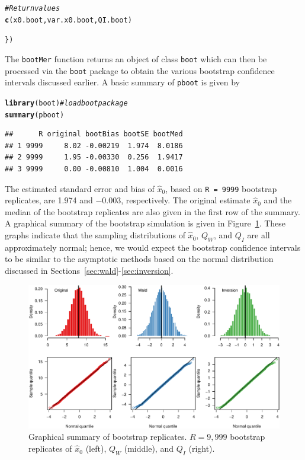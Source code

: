 \documentclass{article}\usepackage[]{graphicx}\usepackage[]{color}
\makeatletter
\newcommand{\hlcom}[1]{\textcolor[rgb]{0.678,0.584,0.686}{\textit{#1}}}%
\newcommand{\hlstd}[1]{\textcolor[rgb]{0.345,0.345,0.345}{#1}}%
\newcommand{\hlkwd}[1]{\textcolor[rgb]{0.737,0.353,0.396}{\textbf{#1}}}%
\newenvironment{kframe}{%
 \def\at@end@of@kframe{}%
 \ifinner\ifhmode%
  \def\at@end@of@kframe{\end{minipage}}%
  \begin{minipage}{\columnwidth}%
 \fi\fi%
 \def\FrameCommand##1{\hskip\@totalleftmargin \hskip-\fboxsep
 \colorbox{shadecolor}{##1}\hskip-\fboxsep
     \hskip-\linewidth \hskip-\@totalleftmargin \hskip\columnwidth}%
 \MakeFramed {\advance\hsize-\width
   \@totalleftmargin\z@ \linewidth\hsize
   \@setminipage}}%
 {\par\unskip\endMakeFramed%
 \at@end@of@kframe}
\newenvironment{knitrout}{}{} %
\makeatother
\begin{document}
\begin{knitrout}
\begin{kframe}
\begin{alltt}
  \hlcom{# Return values}
  \hlkwd{c}\hlstd{(x0.boot, var.x0.boot, QI.boot)}

\hlstd{\})}
\end{alltt}
\end{kframe}
\end{knitrout}
The \texttt{bootMer} function returns an object of class \texttt{boot} which can then be processed via the \texttt{boot} package to obtain the various bootstrap confidence intervals discussed earlier.  A basic summary of \texttt{pboot} is given by
\begin{knitrout}
\color{fgcolor}\begin{kframe}
\begin{alltt}
\hlkwd{library}\hlstd{(boot)}  \hlcom{# load boot package}
\hlkwd{summary}\hlstd{(pboot)}
\end{alltt}
\begin{verbatim}
##      R original bootBias bootSE bootMed
## 1 9999     8.02 -0.00219  1.974  8.0186
## 2 9999     1.95 -0.00330  0.256  1.9417
## 3 9999     0.00 -0.00810  1.004  0.0016
\end{verbatim}
\end{kframe}
\end{knitrout}
The estimated standard error and bias of $\widehat{x}_0$, based on \texttt{R = 9999} bootstrap replicates, are 1.974 and \ensuremath{-0.003}, respectively.  The original estimate $\widehat{x}_0$ and the median of the bootstrap replicates are also given in the first row of the summary.  A graphical summary of the bootstrap simulation is given in Figure~\ref{fig:boot-plots}.  These graphs indicate that the sampling distributions of $\widehat{x}_0$, $Q_W$, and $Q_I$ are all approximately normal; hence, we would expect the bootstrap confidence intervals to be similar to the asymptotic methods based on the normal distribution discussed in Sections~\ref{sec:wald}-\ref{sec:inversion}.
\begin{knitrout}
\color{fgcolor}\begin{figure}[!htb]
\includegraphics[width=\linewidth]{figure/boot-plots-1} \caption[Graphical summary of bootstrap replicates]{Graphical summary of bootstrap replicates. $R = 9,999$ bootstrap replicates of $\widehat{x}_0$ (left), $Q_W$ (middle), and $Q_I$ (right).}\label{fig:boot-plots}
\end{figure}


\end{knitrout}
\end{document}
